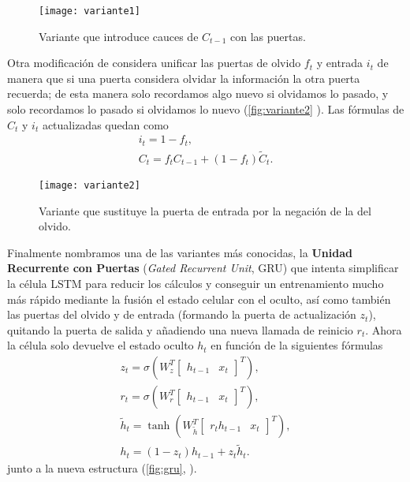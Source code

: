 \begin{figure}[htpb]
  \centering
  \texttt{[image: variante1]}
  \caption{Variante que introduce cauces de $C_{t-1}$ con las puertas.}
  \label{fig:variante1}
\end{figure}

Otra modificación de \cite{gers2000recurrent} considera unificar las puertas de olvido $f_t$ y entrada $i_t$ de manera que si una puerta considera olvidar la información la otra puerta recuerda; de esta manera solo recordamos algo nuevo si olvidamos lo pasado, y solo recordamos lo pasado si olvidamos lo nuevo (\autoref{fig:variante2} \cite{christopher2015lstm}). Las fórmulas de $C_t$ y $i_t$ actualizadas quedan como
\begin{gather*}
  i_t = 1 - f_t, \\
  C_t = f_t C_{t-1} + (1 - f_t) \widetilde{C}_t.
  \label{eq:variante2}
\end{gather*}

\begin{figure}[htpb]
  \centering
  \texttt{[image: variante2]}
  \caption{Variante que sustituye la puerta de entrada por la negación de la del olvido.}
  \label{fig:variante2}
\end{figure}

Finalmente nombramos una de las variantes más conocidas, la \textbf{Unidad Recurrente con Puertas} (\emph{Gated Recurrent Unit}, GRU) \cite{cho2014learning} que intenta simplificar la célula LSTM para reducir los cálculos y conseguir un entrenamiento mucho más rápido mediante la fusión el estado celular con el oculto, así como también las puertas del olvido y de entrada (formando la puerta de actualización $z_t$), quitando la puerta de salida y añadiendo una nueva llamada de reinicio $r_t$. Ahora la célula solo devuelve el estado oculto $h_t$ en función de la siguientes fórmulas
\begin{gather*}
  z_t = \sigma\left(W_z^T \begin{bmatrix} h_{t-1} & x_t \end{bmatrix}^T\right), \\
  r_t = \sigma\left(W_r^T \begin{bmatrix} h_{t-1} & x_t \end{bmatrix}^T \right), \\
  \widetilde{h}_t = \tanh\left(W_{\widetilde{h}}^T \begin{bmatrix} r_t h_{t-1} & x_t \end{bmatrix}^T\right), \\
  h_t = (1 - z_t)h_{t-1} + z_t \widetilde{h}_t.
  \label{eq:gru}
\end{gather*}
junto a la nueva estructura (\autoref{fig:gru}, \cite{christopher2015lstm}).

